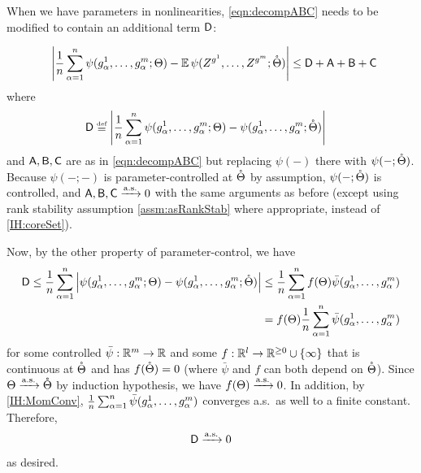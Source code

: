 \documentclass[main.tex]{subfiles}
\begin{document}
When we have parameters in nonlinearities, \cref{eqn:decompABC} needs to be modified to contain an additional term $\mathsf{D}$:

\begin{align*}
    &\phantomeq
        \left|\f 1 n \sum_{\alpha = 1}^n \psi(g^1_\alpha, \ldots, g^{\MM}_\alpha; \bigtheta)
        - \EV \psi(Z^{g^1}, \ldots, Z^{g^\MM}; \mathring{\bigtheta})
        \right|
    \le
        \probD + \probA + \probB + \probC
\end{align*}
where
\begin{align*}
\probD
    &\defeq
        \left|\f 1 n \sum_{\alpha = 1}^n \psi(g^1_\alpha, \ldots, g^{\MM}_\alpha; \bigtheta)
        - \psi(g^1_\alpha, \ldots, g^{\MM}_\alpha; \mathring{\bigtheta})
        \right|
\end{align*}
and $\mathsf{A}, \mathsf{B}, \mathsf{C}$ are as in \cref{eqn:decompABC} but replacing $\psi(-)$ there with $\psi(-; \mathring{\Theta})$.
Because $\psi(-; -)$ is parameter-controlled at $\mathring{\Theta}$ by assumption, $\psi(-; \mathring{\Theta})$ is controlled, and $\mathsf{A}, \mathsf{B}, \mathsf{C} \xrightarrow{\mathrm{a.s.}} 0$ with the same arguments as before (except using rank stability assumption \cref{assm:asRankStab} where appropriate, instead of \ref{IH:coreSet}).

Now, by the other property of parameter-control, we have
\begin{align*}
\mathsf{D}
    \le
        \frac{1}{n} \sum_{\alpha = 1}^n 
        \left|\psi(g^1_\alpha, \ldots, g^{m}_\alpha; \Theta)
        - \psi(g^1_\alpha, \ldots, g^{m}_\alpha; \mathring{\Theta})
        \right|
    &\le
        \frac{1}{n} \sum_{\alpha = 1}^n 
        f(\Theta) \bar \psi(g^1_\alpha, \ldots, g^m_\alpha)
        \\
    &=
        f(\Theta)
        \frac{1}{n} \sum_{\alpha = 1}^n 
        \bar \psi(g^1_\alpha, \ldots, g^m_\alpha)
\end{align*}
for some controlled $\bar \psi: \mathbb{R}^m \to \mathbb{R}$ and some $f: \mathbb{R}^l \to \mathbb{R}^{\ge 0} \cup \{\infty\}$ that is continuous at $\mathring{\Theta}$ and has $f(\mathring{\Theta}) = 0$ (where $\bar \psi$ and $f$ can both depend on $\mathring{\Theta}$).
Since $\Theta \xrightarrow{\mathrm{a.s.}} \mathring{\Theta}$ by induction hypothesis, we have $f(\Theta) \xrightarrow{\mathrm{a.s.}} 0$.
In addition, by \ref{IH:MomConv}, $\frac{1}{n} \sum_{\alpha = 1}^n 
\bar \psi(g^1_\alpha, \ldots, g^m_\alpha)$ converges a.s.\ as well to a finite constant.
Therefore,
\begin{align*}
\mathsf{D} \xrightarrow{\mathrm{a.s.}} 0
\end{align*}
as desired.
\end{document}
